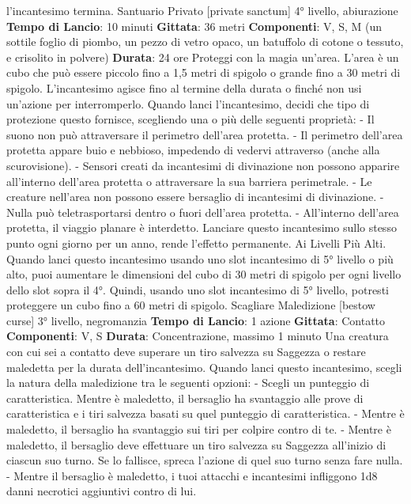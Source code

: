 \begin{multicols}{2}
l’incantesimo termina.
Santuario Privato
[private sanctum]
4° livello, abiurazione
\textbf{Tempo di Lancio}: 10 minuti
\textbf{Gittata}: 36 metri
\textbf{Componenti}: V, S, M (un sottile foglio di piombo, un
pezzo di vetro opaco, un batuffolo di cotone o tessuto, e
crisolito in polvere)
\textbf{Durata}: 24 ore
Proteggi con la magia un’area. L’area è un cubo che
può essere piccolo fino a 1,5 metri di spigolo o grande
fino a 30 metri di spigolo. L’incantesimo agisce fino al
termine della durata o finché non usi un’azione per
interromperlo.
Quando lanci l’incantesimo, decidi che tipo di
protezione questo fornisce, scegliendo una o più delle
seguenti proprietà:
- Il suono non può attraversare il perimetro dell’area
protetta.
- Il perimetro dell’area protetta appare buio e
nebbioso, impedendo di vedervi attraverso (anche
alla scurovisione).
- Sensori creati da incantesimi di divinazione non
possono apparire all’interno dell’area protetta o
attraversare la sua barriera perimetrale.
- Le creature nell’area non possono essere bersaglio
di incantesimi di divinazione.
- Nulla può teletrasportarsi dentro o fuori dell’area
protetta.
- All’interno dell’area protetta, il viaggio planare è
interdetto.
Lanciare questo incantesimo sullo stesso punto ogni
giorno per un anno, rende l’effetto permanente.
Ai Livelli Più Alti. Quando lanci questo incantesimo
usando uno slot incantesimo di 5° livello o più alto, puoi
aumentare le dimensioni del cubo di 30 metri di spigolo
per ogni livello dello slot sopra il 4°. Quindi, usando uno
slot incantesimo di 5° livello, potresti proteggere un
cubo fino a 60 metri di spigolo.
Scagliare Maledizione
[bestow curse]
3° livello, negromanzia
\textbf{Tempo di Lancio}: 1 azione
\textbf{Gittata}: Contatto
\textbf{Componenti}: V, S
\textbf{Durata}: Concentrazione, massimo 1 minuto
Una creatura con cui sei a contatto deve superare un
tiro salvezza su Saggezza o restare maledetta per la
durata dell’incantesimo. Quando lanci questo
incantesimo, scegli la natura della maledizione tra le
seguenti opzioni:
- Scegli un punteggio di caratteristica. Mentre è
maledetto, il bersaglio ha svantaggio alle prove di
caratteristica e i tiri salvezza basati su quel
punteggio di caratteristica.
- Mentre è maledetto, il bersaglio ha svantaggio sui
tiri per colpire contro di te.
- Mentre è maledetto, il bersaglio deve effettuare un
tiro salvezza su Saggezza all’inizio di ciascun suo
turno. Se lo fallisce, spreca l’azione di quel suo
turno senza fare nulla.
- Mentre il bersaglio è maledetto, i tuoi attacchi e
incantesimi infliggono 1d8 danni necrotici aggiuntivi
contro di lui.

\end{multicols}
